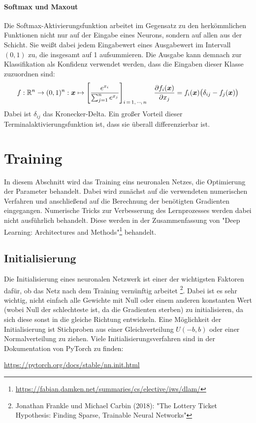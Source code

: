 		\paragraph{Softmax und Maxout}
			Die Softmax-Aktivierungsfunktion arbeitet im Gegensatz zu den herkömmlichen Funktionen nicht nur auf der Eingabe eines Neurons, sondern auf allen aus der Schicht. Sie weißt dabei jedem Eingabewert eines Ausgabewert im Intervall \( (0, 1) \) zu, die insgesamt auf \num{1} aufsummieren. Die Ausgabe kann demnach zur Klassifikation als Konfidenz verwendet werden, dass die Eingaben dieser Klasse zuzuordnen sind:
			\begin{align}
				f : \mathbb{R}^n \to (0, 1)^n : \bm{x} \mapsto
					\Bigg[ \frac{e^{x_i}}{\sum_{j = 1}^{n} e^{x_j}} \Bigg]_{i \,=\, 1,\,\cdots\!,\,n} &&
				\pdv{f_i(\bm{x})}{x_j} = f_i(\bm{x}) \big( \delta_{ij} - f_j(\bm{x}) \big)
			\end{align}
			Dabei ist \(\delta_{ij}\) das Kronecker-Delta. Ein großer Vorteil dieser Terminalaktivierungsfunktion ist, dass sie überall differenzierbar ist.

	\section{Training}
		In diesem Abschnitt wird das Training eins neuronalen Netzes, \dh die Optimierung der Parameter behandelt. Dabei wird zunächst auf die verwendeten numerischen Verfahren und anschließend auf die Berechnung der benötigten Gradienten eingegangen. Numerische Tricks zur Verbesserung des Lernprozesses werden dabei nicht ausführlich behandelt. Diese werden in der Zusammenfassung von "Deep Learning: Architectures and Methods"\footnote{\url{https://fabian.damken.net/summaries/cs/elective/iws/dlam/}} behandelt.

		\subsection{Initialisierung}
			Die Initialisierung eines neuronalen Netzwerk ist einer der wichtigsten Faktoren dafür, ob das Netz nach dem Training vernünftig arbeitet \footnote{Jonathan Frankle und Michael Carbin (2018): "The Lottery Ticket Hypothesis: Finding Sparse, Trainable Neural Networks"}. Dabei ist es sehr wichtig, nicht einfach alle Gewichte mit Null oder einem anderen konstanten Wert (wobei Null der schlechteste ist, da die Gradienten sterben) zu initialisieren, da sich diese sonst in die gleiche Richtung entwickeln. Eine Möglichkeit der Initialisierung ist Stichproben aus einer Gleichverteilung \( U(-b, b) \) oder einer Normalverteilung zu ziehen. Viele Initialisierungsverfahren sind \zB in der Dokumentation von PyTorch zu finden:
			\begin{center}
				\url{https://pytorch.org/docs/stable/nn.init.html}
			\end{center}

